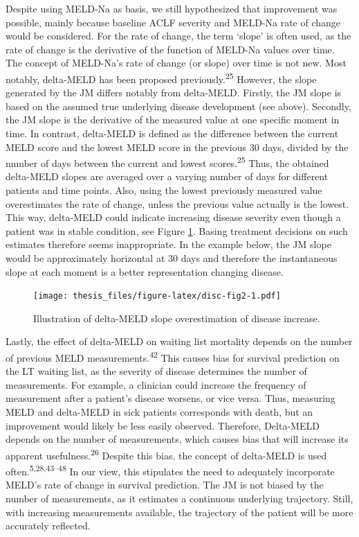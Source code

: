 \documentclass[11pt,english,]{book} %
\begin{document}
Despite using MELD-Na as basis, we still hypothesized that improvement was possible, mainly because baseline ACLF severity and MELD-Na rate of change would be considered. For the rate of change, the term `slope' is often used, as the rate of change is the derivative of the function of MELD-Na values over time. The concept of MELD-Na's rate of change (or slope) over time is not new. Most notably, delta-MELD has been proposed previously.\textsuperscript{25} However, the slope generated by the JM differs notably from delta-MELD. Firstly, the JM slope is based on the assumed true underlying disease development (see above). Secondly, the JM slope is the derivative of the measured value at one specific moment in time. In contrast, delta-MELD is defined as the difference between the current MELD score and the lowest MELD score in the previous 30 days, divided by the number of days between the current and lowest scores.\textsuperscript{25} Thus, the obtained delta-MELD slopes are averaged over a varying number of days for different patients and time points. Also, using the lowest previously measured value overestimates the rate of change, unless the previous value actually is the lowest. This way, delta-MELD could indicate increasing disease severity even though a patient was in stable condition, see Figure \ref{fig:disc-fig2}. Basing treatment decisions on such estimates therefore seems inappropriate. In the example below, the JM slope would be approximately horizontal at 30 days and therefore the instantaneous slope at each moment is a better representation changing disease.

\begin{figure}
\centering
\texttt{[image: thesis\_files/figure-latex/disc-fig2-1.pdf]}
\caption{\label{fig:disc-fig2}Illustration of delta-MELD slope overestimation of disease increase.}
\end{figure}

Lastly, the effect of delta-MELD on waiting list mortality depends on the number of previous MELD measurements.\textsuperscript{42} This causes bias for survival prediction on the LT waiting list, as the severity of disease determines the number of measurements. For example, a clinician could increase the frequency of measurement after a patient's disease worsens, or vice versa. Thus, measuring MELD and delta-MELD in sick patients corresponds with death, but an improvement would likely be less easily observed. Therefore, Delta-MELD depends on the number of measurements, which causes bias that will increase its apparent usefulness.\textsuperscript{26} Despite this bias, the concept of delta-MELD is used often.\textsuperscript{5,28,43--48} In our view, this stipulates the need to adequately incorporate MELD's rate of change in survival prediction. The JM is not biased by the number of measurements, as it estimates a continuous underlying trajectory. Still, with increasing measurements available, the trajectory of the patient will be more accurately reflected.
\end{document}
